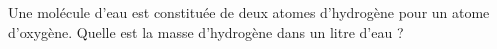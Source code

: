
\begin{exercice}\label{exo2smath-0129}

    Une molécule d'eau est constituée de deux atomes d'hydrogène pour un atome d'oxygène. Quelle est la masse d'hydrogène dans un litre d'eau ?

\end{exercice}
